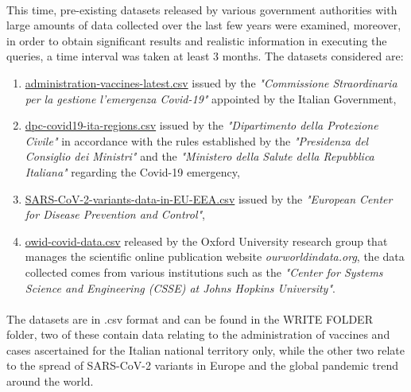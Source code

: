 \documentclass[a4paper,12pt]{article}
\begin{document}
\paragraph{} This time, pre-existing datasets released by various government authorities with large amounts of data collected over the last few years were examined, moreover, in order to obtain significant results and realistic information in executing the queries, a time interval was taken at least 3 months. The datasets considered are:
  \begin{enumerate}[noitemsep]
    \item \href{https://raw.githubusercontent.com/italia/covid19-opendata-vaccini/master/dati/somministrazioni-vaccini-latest.csv}{administration-vaccines-latest.csv} issued by the \emph{"Commissione Straordinaria per la gestione l’emergenza Covid-19"} appointed by the Italian Government,
    \item \href{https://raw.githubusercontent.com/pcm-dpc/COVID-19/master/dati-regioni/dpc-covid19-ita-regioni.csv}{dpc-covid19-ita-regions.csv} issued by the \emph{"Dipartimento della Protezione Civile"} in accordance with the rules established by the \emph{"Presidenza del Consiglio dei Ministri"} and the \emph{"Ministero della Salute della Repubblica Italiana"} regarding the Covid-19 emergency,
    \item \href{https://www.ecdc.europa.eu/en/publications-data/data-virus-variants-covid-19-eueea}{SARS-CoV-2-variants-data-in-EU-EEA.csv} issued by the \emph{"European Center for Disease Prevention and Control"},
    \item \href{https://raw.githubusercontent.com/owid/covid-19-data/master/public/data/owid-covid-data.csv}{owid-covid-data.csv} released by the Oxford University research group that manages the scientific online publication website \emph{ourworldindata.org}, the data collected comes from various institutions such as the \emph{"Center for Systems Science and Engineering (CSSE) at Johns Hopkins University"}.
   \end{enumerate}
\newpage
\paragraph{} The datasets are in .csv format and can be found in the WRITE FOLDER folder, two of these contain data relating to the administration of vaccines and cases ascertained for the Italian national territory only, while the other two relate to the spread of SARS-CoV-2 variants in Europe and the global pandemic trend around the world.
\end{document}
